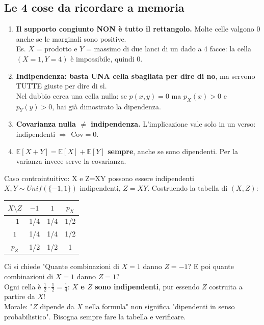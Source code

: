 \documentclass[12pt]{extarticle} %
\begin{document}
\subsection{Le 4 cose da ricordare a memoria}
\begin{enumerate}
    \item \textbf{Il supporto congiunto NON è tutto il rettangolo.} Molte celle valgono $0$ anche se le marginali sono positive. \\ {\footnotesize Es. $X$ = prodotto e $Y$ = massimo di due lanci di un dado a 4 facce: la cella $(X{=}1, Y{=}4)$ è impossibile, quindi $0$.}
    \item \textbf{Indipendenza: basta UNA cella sbagliata per dire di no}, ma servono TUTTE giuste per dire di sì. \\ {\footnotesize Nel dubbio cerca una cella nulla: se $p(x,y)=0$ ma $p_X(x)>0$ e $p_Y(y)>0$, hai già dimostrato la dipendenza.}
    \item \textbf{Covarianza nulla $\ne$ indipendenza.} L'implicazione vale solo in un verso: indipendenti $\Rightarrow$ $\mathrm{Cov}=0$.
    \item \textbf{$\mathbb{E}[X+Y] = \mathbb{E}[X]+\mathbb{E}[Y]$ sempre}, anche se sono dipendenti. Per la varianza invece serve la covarianza.
\end{enumerate}

\begin{eserciziobox}{{Caso controintuitivo: X e Z=XY possono essere indipendenti}}
$X, Y \sim Unif(\{-1,1\})$ indipendenti, $Z = XY$. Costruendo la tabella di $(X,Z)$:
\begin{center}
\begin{tabular}{|c|c|c|c|}
\hline $X \setminus Z$ & $-1$ & $1$ & $p_X$ \\ \hline
$-1$ & 1/4 & 1/4 & 1/2 \\ \hline
$1$ & 1/4 & 1/4 & 1/2 \\ \hline
$p_Z$ & 1/2 & 1/2 & 1 \\ \hline
\end{tabular}
\end{center}
Ci si chiede "Quante combinazioni di $X=1$ danno $Z=-1$? E poi quante combinazioni di $X=1$ danno $Z=1$?\\
Ogni cella è $\frac12 \cdot \frac12 = \frac14$: \textbf{$X$ e $Z$ sono indipendenti}, pur essendo $Z$ costruita a partire da $X$! \\
{\footnotesize Morale: "$Z$ dipende da $X$ nella formula" non significa "dipendenti in senso probabilistico". Bisogna sempre fare la tabella e verificare.}
\end{eserciziobox}
\end{document}
